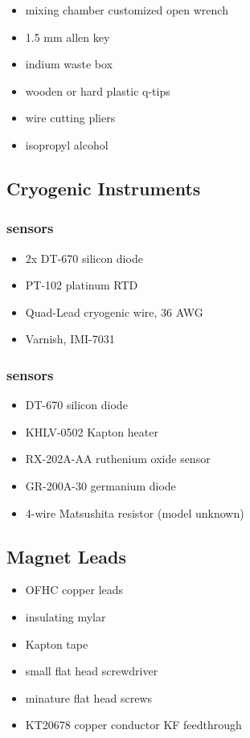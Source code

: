 \begin{itemize}
  \item mixing chamber customized open wrench
  \item 1.5 mm allen key
  \item indium waste box
  \item wooden or hard plastic q-tips
  \item wire cutting pliers
  \item isopropyl alcohol 
\end{itemize}


  \subsection{Cryogenic Instruments}

\subsubsection{\hef{} sensors}
  \begin{itemize}
   \item 2x  DT-670 silicon diode
\item {} PT-102 platinum RTD
\item {} Quad-Lead cryogenic wire, 36 AWG
\item {} Varnish, IMI-7031
  \end{itemize}
\subsubsection{\het{} sensors}
\begin{itemize}
 \item {} DT-670 silicon diode
 \item {} KHLV-0502 Kapton heater
 \item {} RX-202A-AA ruthenium oxide sensor
 \item {} GR-200A-30 germanium diode
 \item 4-wire Matsushita resistor (model unknown) 

\end{itemize}

  \subsection{Magnet Leads}
\begin{itemize}
 \item OFHC copper leads
\item insulating mylar
\item Kapton tape
\item small flat head screwdriver
\item minature flat head screws
\item {} KT20678 copper conductor KF feedthrough
\end{itemize}


